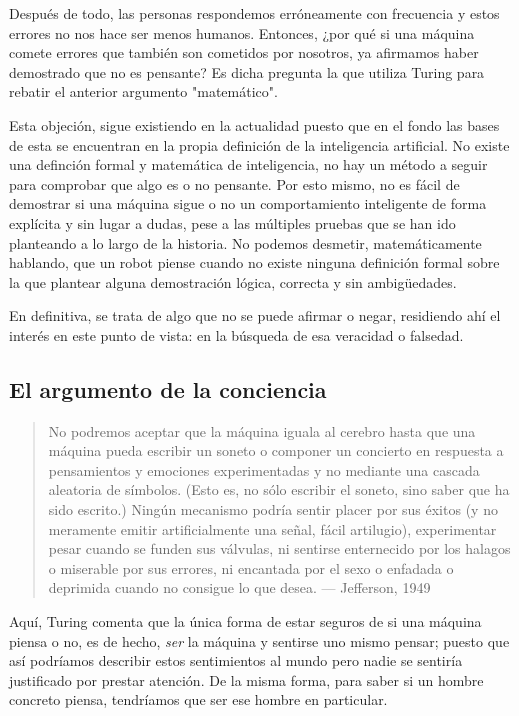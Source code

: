 \documentclass[12pt,a4paper]{article}
\begin{document}
Después de todo, las personas respondemos erróneamente con frecuencia y estos errores no nos hace ser menos humanos. Entonces, ¿por qué si una máquina comete errores que también son cometidos por nosotros, ya afirmamos haber demostrado que no es pensante? Es dicha pregunta la que utiliza Turing para rebatir el anterior argumento "matemático".

Esta objeción, sigue existiendo en la actualidad puesto que en el fondo las bases de esta se encuentran en la propia definición de la inteligencia artificial. No existe una definción formal y matemática de inteligencia, no hay un método a seguir para comprobar que algo es o no pensante. Por esto mismo, no es fácil de demostrar si una máquina sigue o no un comportamiento inteligente de forma explícita y sin lugar a dudas, pese a las múltiples pruebas que se han ido planteando a lo largo de la historia. No podemos desmetir, matemáticamente hablando, que un robot piense cuando no existe ninguna definición formal sobre la que plantear alguna demostración lógica, correcta y sin ambigüedades.

En definitiva, se trata de algo que no se puede afirmar o negar, residiendo ahí el interés en este punto de vista: en la búsqueda de esa veracidad o falsedad.


\subsection{El argumento de la conciencia}
\begin{quote}\small No podremos aceptar que la máquina iguala al cerebro hasta que una máquina pueda escribir un soneto o componer un concierto en respuesta a pensamientos y emociones experimentadas y no mediante una cascada aleatoria de símbolos. (Esto es, no sólo escribir el soneto, sino saber que ha sido escrito.) Ningún mecanismo podría sentir placer por sus éxitos (y no meramente emitir artificialmente una señal, fácil artilugio), experimentar pesar cuando se funden sus válvulas, ni sentirse enternecido por los halagos o miserable por sus errores, ni encantada por el sexo o enfadada o deprimida cuando no consigue lo que desea. — Jefferson, 1949\end{quote}

Aquí, Turing comenta que la única forma de estar seguros de si una máquina piensa o no, es de hecho, \emph{ser} la máquina y sentirse uno mismo pensar; puesto que así podríamos describir estos sentimientos al mundo pero nadie se sentiría justificado por prestar atención. De la misma forma, para saber si un hombre concreto piensa, tendríamos que ser ese hombre en particular.
\end{document}
